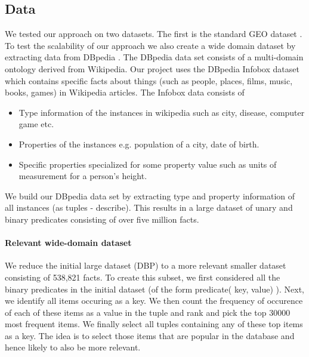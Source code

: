 \documentclass[11pt]{article}
\begin{document}
\subsection{Data}
We tested our approach on two datasets. The first is the standard {\sc GEO} dataset \cite{ZM96}. To test the scalability of our approach we also create a wide domain dataset by extracting data from DBpedia \cite{dbpedia}. %
The DBpedia data set consists of a multi-domain ontology derived from Wikipedia. Our project uses the DBpedia Infobox dataset \cite{dbpedia2, dbInfo} which contains specific facts about things (such as people, places, films, music, books, games) in Wikipedia articles. The Infobox data consists of
\begin{itemize}
\item Type information of the instances in wikipedia such as city, disease, computer game etc.
\item Properties of the instances e.g. population of a city, date of birth.
\item Specific properties specialized for some property value such as units of measurement for a person's height.
\end{itemize}
We build our DBpedia data set by extracting type and property information of all instances (as tuples - describe). This results in a large dataset of unary and binary predicates consisting of over five million facts. 

\paragraph{Relevant wide-domain dataset} We reduce the initial large dataset (DBP) to a more relevant smaller dataset consisting of 538,821 facts. To create this subset, we first considered all the binary predicates in the initial dataset (of the form predicate( key, value) ). Next, we identify all items occuring as a key. We then count the frequency of occurence of each of these items as a value in the tuple and rank and pick the top 30000 most frequent items. We finally select all tuples containing any of these top items as a key. The idea is to select those items that are popular in the database and hence likely to also be more relevant.
\end{document}
